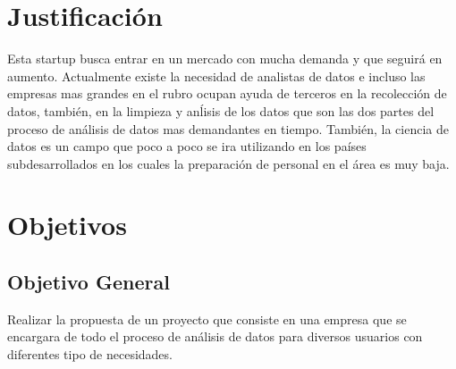\documentclass[12pt,a4paper,openright]{article}
\begin{document}


\section{Justificación}


Esta startup busca entrar en un mercado con mucha demanda y que seguirá en aumento. Actualmente existe la necesidad de analistas de datos e incluso las empresas mas grandes en el rubro ocupan ayuda de terceros en la recolección de datos, también,  en la limpieza y an\'lisis de los datos que son las dos partes del proceso de an\'alisis de datos mas demandantes en tiempo. También, la ciencia de datos es un campo que poco a poco se ira utilizando en los países subdesarrollados  en los cuales la preparación de personal en el área es muy baja.








\section{Objetivos}
\subsection{Objetivo General}
Realizar la propuesta de un proyecto que consiste en una empresa que se encargara de todo el proceso de an\'alisis de datos para diversos usuarios con diferentes tipo de necesidades.
\end{document}
